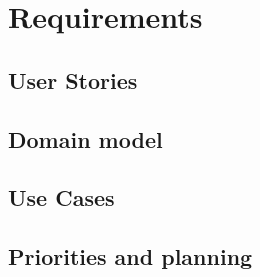 \chapter{Requirements}

\section{User Stories}


\section{Domain model}


\section{Use Cases}
















\section{Priorities and planning}
